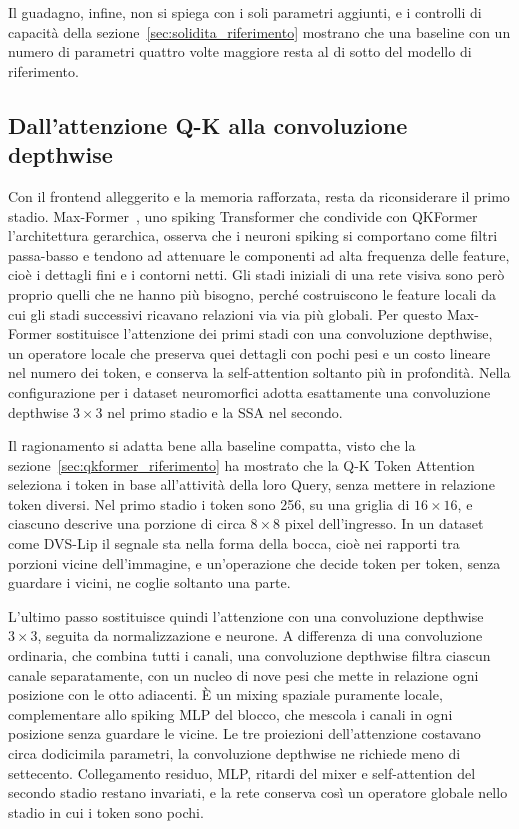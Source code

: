 Il guadagno, infine, non si spiega con i soli parametri aggiunti, e i controlli di capacità della sezione~\ref{sec:solidita_riferimento} mostrano che una baseline con un numero di parametri quattro volte maggiore resta al di sotto del modello di riferimento.

\subsection{Dall'attenzione Q-K alla convoluzione depthwise}
\label{subsec:depthwise}

Con il frontend alleggerito e la memoria rafforzata, resta da riconsiderare il primo stadio. Max-Former~\cite{fang2025maxformer}, uno spiking Transformer che condivide con QKFormer l'architettura gerarchica, osserva che i neuroni spiking si comportano come filtri passa-basso e tendono ad attenuare le componenti ad alta frequenza delle feature, cioè i dettagli fini e i contorni netti. Gli stadi iniziali di una rete visiva sono però proprio quelli che ne hanno più bisogno, perché costruiscono le feature locali da cui gli stadi successivi ricavano relazioni via via più globali. Per questo Max-Former sostituisce l'attenzione dei primi stadi con una convoluzione depthwise, un operatore locale che preserva quei dettagli con pochi pesi e un costo lineare nel numero dei token, e conserva la self-attention soltanto più in profondità. Nella configurazione per i dataset neuromorfici adotta esattamente una convoluzione depthwise $3\times3$ nel primo stadio e la SSA nel secondo.

Il ragionamento si adatta bene alla baseline compatta, visto che la sezione~\ref{sec:qkformer_riferimento} ha mostrato che la Q-K Token Attention seleziona i token in base all'attività della loro Query, senza mettere in relazione token diversi. Nel primo stadio i token sono 256, su una griglia di $16\times16$, e ciascuno descrive una porzione di circa $8\times8$ pixel dell'ingresso. In un dataset come DVS-Lip il segnale sta nella forma della bocca, cioè nei rapporti tra porzioni vicine dell'immagine, e un'operazione che decide token per token, senza guardare i vicini, ne coglie soltanto una parte.

L'ultimo passo sostituisce quindi l'attenzione con una convoluzione depthwise $3\times3$, seguita da normalizzazione e neurone. A differenza di una convoluzione ordinaria, che combina tutti i canali, una convoluzione depthwise filtra ciascun canale separatamente, con un nucleo di nove pesi che mette in relazione ogni posizione con le otto adiacenti. È un mixing spaziale puramente locale, complementare allo spiking MLP del blocco, che mescola i canali in ogni posizione senza guardare le vicine. Le tre proiezioni dell'attenzione costavano circa dodicimila parametri, la convoluzione depthwise ne richiede meno di settecento. Collegamento residuo, MLP, ritardi del mixer e self-attention del secondo stadio restano invariati, e la rete conserva così un operatore globale nello stadio in cui i token sono pochi.

